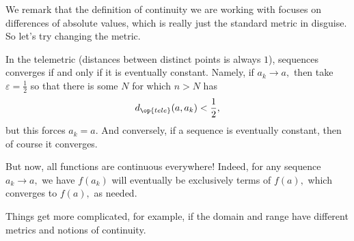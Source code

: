 \documentclass[../notes.tex]{subfiles}
\begin{document}
We remark that the definition of continuity we are working with focuses on differences of absolute values, which is really just the standard metric in disguise. So let's try changing the metric.
\begin{example}
	In the telemetric (distances between distinct points is always $1$), sequences converges if and only if it is eventually constant. Namely, if $a_k\to a,$ then take $\varepsilon=\frac12$ so that there is some $N$ for which $n>N$ has
	\[d_{\op{tele}}(a,a_k)<\frac12,\]
	but this forces $a_k=a.$ And conversely, if a sequence is eventually constant, then of course it converges.

	But now, all functions are continuous everywhere! Indeed, for any sequence $a_k\to a,$ we have $f(a_k)$ will eventually be exclusively terms of $f(a),$ which converges to $f(a),$ as needed.
\end{example}
Things get more complicated, for example, if the domain and range have different metrics and notions of continuity.
\end{document}
